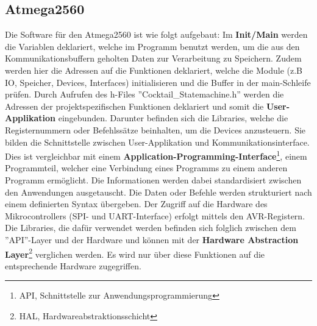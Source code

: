 \subsection{Atmega2560}
\label{subsec:Software_Atmega2560}

Die Software für den Atmega2560 ist wie folgt aufgebaut: 
Im \textbf{Init/Main} werden die Variablen deklariert, welche im Programm benutzt werden, um die aus den Kommunikationsbuffern geholten Daten zur Verarbeitung zu Speichern.
Zudem werden hier die Adressen auf die Funktionen deklariert, welche die Module (z.B IO, Speicher, Devices, Interfaces) initialisieren und die Buffer in der main-Schleife prüfen.
Durch Aufrufen des h-Files ''Cocktail\_Statemachine.h'' werden die Adressen der projektspezifischen Funktionen deklariert und somit die \textbf{User-Applikation} eingebunden. Darunter befinden sich die Libraries, welche die Registernummern oder Befehlssätze beinhalten, um die Devices anzusteuern.
Sie bilden die Schnittstelle zwischen User-Applikation und Kommunikationsinterface.
Dies ist vergleichbar mit einem \textbf{Application-Programming-Interface}\footnote{API, Schnittstelle zur Anwendungsprogrammierung}, einem Programmteil, welcher eine Verbindung eines Programms zu einem anderen Programm ermöglicht. 
Die Informationen werden dabei standardisiert zwischen den Anwendungen ausgetauscht.
Die Daten oder Befehle werden strukturiert nach einem definierten Syntax übergeben.
Der Zugriff auf die Hardware des Mikrocontrollers (SPI- und UART-Interface) erfolgt mittels den AVR-Registern.
Die Libraries, die dafür verwendet werden befinden sich folglich zwischen dem ''API''-Layer und der Hardware und können mit der \textbf{Hardware Abstraction Layer}\footnote{HAL, Hardwareabstraktionsschicht} verglichen werden.
Es wird nur über diese Funktionen auf die entsprechende Hardware zugegriffen. \cite{geisler_was_2018}
